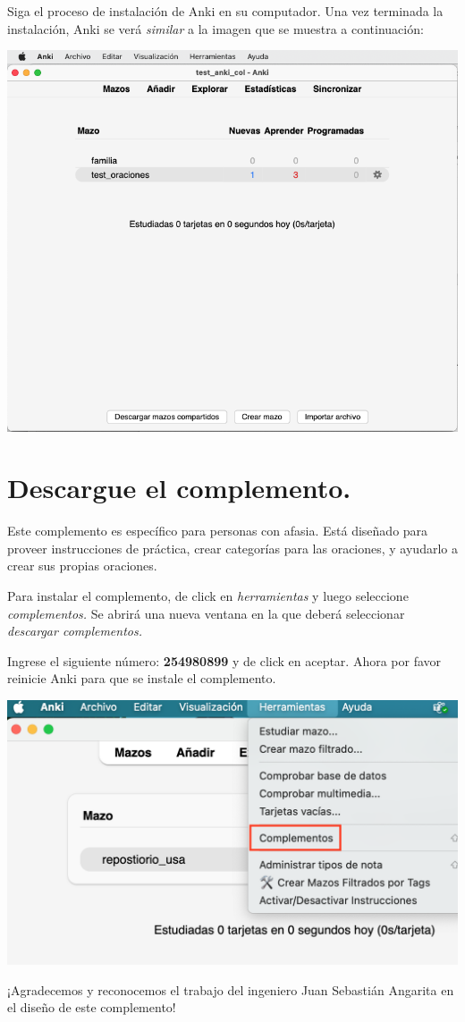 \documentclass[
]{book}
\begin{document}
Siga el proceso de instalación de Anki en su computador. Una vez terminada la instalación, Anki se verá \emph{similar} a la imagen que se muestra a continuación:

\includegraphics[width=0.6\linewidth]{images/reposit_sp/anki_screen}

\section{Descargue el complemento.}\label{descargue-el-complemento.}

Este complemento es específico para personas con afasia. Está diseñado para proveer instrucciones de práctica, crear categorías para las oraciones, y ayudarlo a crear sus propias oraciones.

Para instalar el complemento, de click en \emph{herramientas} y luego seleccione \emph{complementos.} Se abrirá una nueva ventana en la que deberá seleccionar \emph{descargar complementos.}

Ingrese el siguiente número: \textbf{254980899} y de click en aceptar. Ahora por favor reinicie Anki para que se instale el complemento.

\includegraphics[width=0.6\linewidth]{images/reposit_sp/complemento}

¡Agradecemos y reconocemos el trabajo del ingeniero Juan Sebastián Angarita en el diseño de este complemento!
\end{document}
